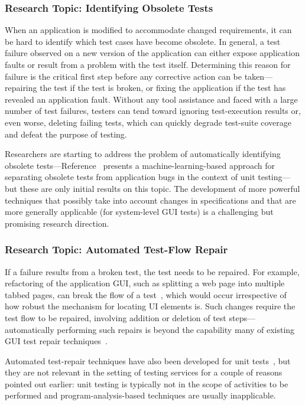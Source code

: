 \subsubsection*{Research Topic: Identifying Obsolete Tests}

When an application is modified to accommodate changed requirements, it can be
hard to identify which test cases have become obsolete.  In general, a test
failure observed on a new version of the application can either expose
application faults or result from a problem with the test itself. Determining
this reason for failure is the critical first step before any corrective action
can be taken---repairing the test if the test is broken, or fixing the
application if the test has revealed an application fault. Without any tool
assistance and faced with a large number of test failures, testers can tend
toward ignoring test-execution results or, even worse, deleting failing tests,
which can quickly degrade test-suite coverage and defeat the purpose of testing.

Researchers are starting to address the problem of automatically identifying
obsolete tests---\eg Reference~\cite{Hao:2013} presents a machine-learning-based
approach for separating obsolete tests from application bugs in the context of
unit testing---but these are only initial results on this topic. The development
of more powerful techniques that possibly take into account changes in
specifications and that are more generally applicable (\eg for system-level GUI
tests) is a challenging but promising research direction.

\subsubsection*{Research Topic: Automated Test-Flow Repair}

If a failure results from a broken test, the test needs to be repaired.  For
example, refactoring of the application GUI, such as splitting a web page into
multiple tabbed pages, can break the flow of a test~\cite{thummalapenta:2013a},
which would occur irrespective of how robust the mechanism for locating UI
elements is. Such changes require the test flow to be repaired, involving
addition or deletion of test steps---automatically performing such repairs is
beyond the capability many of existing GUI test repair
techniques~\cite{Choudhary:2011, Grechanik:2009, Memon:2008}.

Automated test-repair techniques have also been developed for unit
tests~\cite{Daniel:2009, Daniel:2010, Mirzaaghaei:2012}, but they are not
relevant in the setting of testing services for a couple of reasons pointed out
earlier: unit testing is typically not in the scope of activities to be
performed and program-analysis-based techniques are usually inapplicable.

